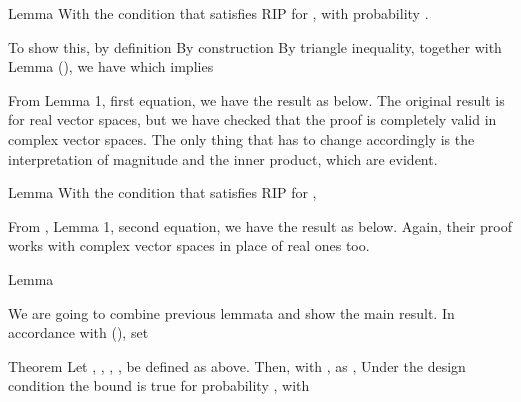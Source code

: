 \Result
{Lemma}
{
With the condition that  satisfies RIP for ,
with probability .
}

To show this, by definition
By construction
By triangle inequality, together with Lemma (), we have
which implies

From  Lemma 1, first equation, we have the result as below.
The original result is for real vector spaces, but we have checked that the proof is completely valid in complex vector spaces.
The only thing that has to change accordingly is the interpretation of magnitude and the inner product, which are evident.

\Result
{Lemma}
{
With the condition that  satisfies RIP for ,
}

From , Lemma 1, second equation, we have the result as below.
Again, their proof works with complex vector spaces in place of real ones too.

\Result
{Lemma}
{
}

\stopsection

\startsection [title={The Main Result}]

We are going to combine previous lemmata and show the main result.
In accordance with (), set

\Result
{Theorem}
{
Let , , , ,  be defined as above.
Then, with , as ,
Under the design condition
the bound is true for probability , with
}

